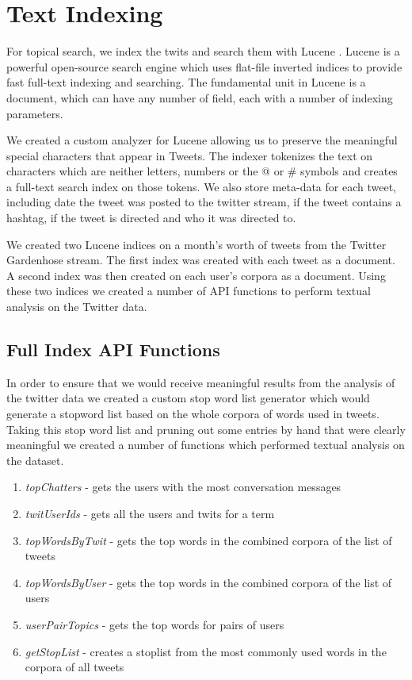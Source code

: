\section{Text Indexing}

For topical search, we index the twits and search them with Lucene \cite{code:lucene}.
Lucene is a powerful open-source search engine which uses flat-file inverted indices to provide fast full-text indexing and searching.  The fundamental unit in Lucene is a document, which can have any number of field, each with a number of indexing parameters.

We created a custom analyzer for Lucene allowing us to preserve the meaningful special characters that appear in Tweets.  The indexer tokenizes the text on characters which are neither letters, numbers or the @ or \# symbols and creates a full-text search index on those tokens.  We also store meta-data for each tweet, including date the tweet was posted to the twitter stream, if the tweet contains a hashtag, if the tweet is directed and who it was directed to.

We created two Lucene indices on a month's worth of tweets from the Twitter Gardenhose stream.  The first index was created with each tweet as a document.  A second index was then created on each user's corpora as a document.  Using these two indices we created a number of API functions to perform textual analysis on the Twitter data.

\subsection{Full Index API Functions}

In order to ensure that we would receive meaningful results from the analysis of the twitter data we created a custom stop word list generator which would generate a stopword list based on the whole corpora of words used in tweets.  Taking this stop word list and pruning out some entries by hand that were clearly meaningful we created a number of functions which performed textual analysis on the dataset.

\begin{enumerate}
\item \emph{topChatters} - gets the users with the most conversation messages
\item \emph{twitUserIds} - gets all the users and twits for a term
\item \emph{topWordsByTwit} - gets the top words in the combined corpora of the list of tweets
\item \emph{topWordsByUser} - gets the top words in the combined corpora of the list of users
\item \emph{userPairTopics} - gets the top words for pairs of users
\item \emph{getStopList} - creates a stoplist from the most commonly used words in the corpora of all tweets
\end{enumerate}

